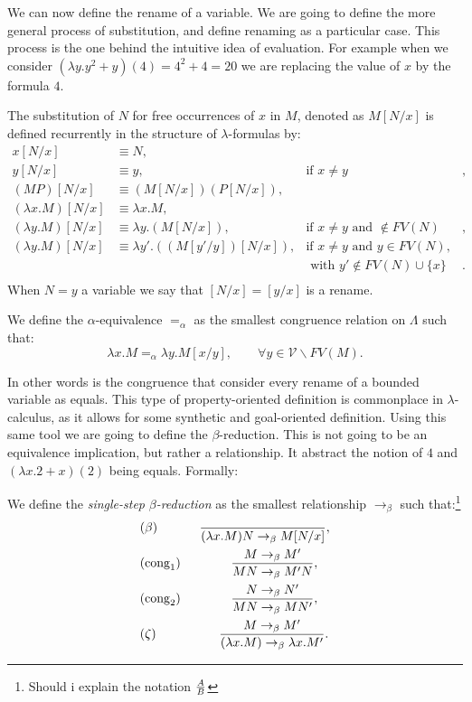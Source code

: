 We can now define the rename of a variable. We are  going to define the more general process of substitution, and define renaming as a particular case. This process is the one behind the intuitive idea of evaluation. For example when we consider $(\lambda y. y^2+y)(4) = 4^2+4 = 20$ we are replacing the value of $x$ by the formula $4$. 
\begin{definition}\label{def:substition}
  The substitution of $N$ for free occurrences of $x$ in $M$, denoted as $M[N/x]$ is defined recurrently in the structure of $\lambda$-formulas by:
  \begin{align*}
    x[N/x]& \equiv N,\\
    y[N/x]& \equiv y, &  \text{if } x\ne y&,\\
    (MP)[N/x]& \equiv (M[N/x])(P[N/x]),\\
    (\lambda x.M)[N/x] & \equiv \lambda x.M,\\
    (\lambda y.M)[N/x] & \equiv \lambda y.(M[N/x]), & \text{if } x\ne y \text{ and } \not \in FV(N)&,\\
    (\lambda y.M)[N/x] & \equiv \lambda y'.((M[y'/y])[N/x]), & \text{if } x\ne y \text{ and } y\in FV(N),\\
          & & \text{ with } y' \not \in FV(N) \cup \{x\}&.\\
  \end{align*}
  When $N = y$ a variable we say that $[N/x] = [y/x]$ is a rename. 
\end{definition}

\begin{definition}
  We define the $\alpha$-equivalence $=_\alpha$ as the smallest congruence relation on $\Lambda$ such that:
  $$\lambda x. M =_\alpha \lambda y. M[x/y], \qquad \forall y \in \mathcal{V} \backslash FV(M).$$
\end{definition}
In other words is the congruence that consider every rename of a bounded variable as equals. This type of property-oriented definition is commonplace in $\lambda$-calculus, as it allows for some synthetic and goal-oriented definition. Using this same tool we are going to define the $\beta$-reduction. This is not going to be an equivalence implication, but rather a relationship. It abstract the notion of $4$ and $(\lambda x. 2+x)(2)$ being equals. Formally:

\begin{definition}
  We define the \emph{single-step} $\beta$\emph{-reduction} as the smallest relationship $\to_\beta$ such that:\footnote{Should i explain the notation ${A \over B}$}
  \begin{align*}
    &(\beta) \qquad\ \ \  \ {\ \over(\lambda x.M)N \to_\beta M[N/x]},\\
    &(\operatorname{cong}_1)\qquad\qquad{ M \to_\beta M' \over MN \to_\beta M'N },\\
    &(\operatorname{cong}_2)\qquad\qquad{ N \to_\beta N' \over MN \to_\beta MN' },\\
    &(\zeta) \qquad\qquad \ \  \ {M\to_\beta M' \over(\lambda x.M) \to_\beta \lambda x.M'}.\\
  \end{align*}
\end{definition}

